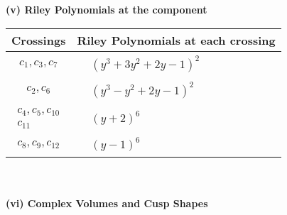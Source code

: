\documentclass[1p]{elsarticle_modified}
\theoremstyle{definition}
\begin{document}
\newpage\renewcommand{\arraystretch}{1}
\flushleft \textbf{(v) Riley Polynomials at the component}\newline \\
\begin{tabular}{m{50pt}|m{274pt}}
Crossings & \hspace{64pt}Riley Polynomials at each crossing \\
\hline $$\begin{aligned}c_{1},c_{3},c_{7}\end{aligned}$$&$\begin{aligned}
&(y^3+3 y^2+2 y-1)^2
\end{aligned}$\\
\hline $$\begin{aligned}c_{2},c_{6}\end{aligned}$$&$\begin{aligned}
&(y^3- y^2+2 y-1)^2
\end{aligned}$\\
\hline $$\begin{aligned}c_{4},c_{5},c_{10}\\c_{11}\end{aligned}$$&$\begin{aligned}
&(y+2)^6
\end{aligned}$\\
\hline $$\begin{aligned}c_{8},c_{9},c_{12}\end{aligned}$$&$\begin{aligned}
&(y-1)^6
\end{aligned}$\\
\hline
\end{tabular}\\~\\
\newpage\flushleft \textbf{(vi) Complex Volumes and Cusp Shapes}
\end{document}
